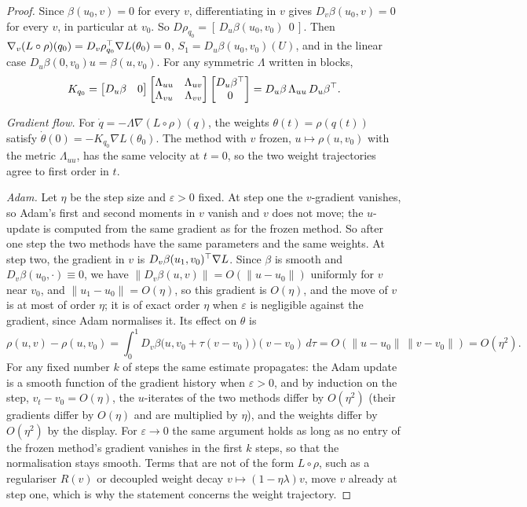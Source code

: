 \begin{proof}
Since $\beta(u_0,v)=0$ for every $v$, differentiating in $v$ gives $D_v\beta(u_0,v)=0$ for every $v$, in particular at
$v_0$. So $D\rho_{q_0}=[\,D_u\beta(u_0,v_0)\ \ 0\,]$. Then $\nabla_v(L\circ\rho)(q_0)=D_v\rho_{q_0}^{\top}\nabla L(\theta_0)=0$,
$S_1=D_u\beta(u_0,v_0)(U)$, and in the linear case $D_u\beta(0,v_0)u=\beta(u,v_0)$. For any symmetric $\Lambda$ written in
blocks,
\begin{equation*}
  K_{q_0}=\begin{bmatrix}D_u\beta&0\end{bmatrix}\begin{bmatrix}\Lambda_{uu}&\Lambda_{uv}\\ \Lambda_{vu}&\Lambda_{vv}
  \end{bmatrix}\begin{bmatrix}D_u\beta^{\top}\\ 0\end{bmatrix}=D_u\beta\,\Lambda_{uu}\,D_u\beta^{\top} .
\end{equation*}

\emph{Gradient flow.} For $\dot q=-\Lambda\nabla(L\circ\rho)(q)$, the weights $\theta(t)=\rho(q(t))$ satisfy
$\dot\theta(0)=-K_{q_0}\nabla L(\theta_0)$. The method with $v$ frozen, $u\mapsto\rho(u,v_0)$ with the metric
$\Lambda_{uu}$, has the same velocity at $t=0$, so the two weight trajectories agree to first order in $t$.

\emph{Adam.} Let $\eta$ be the step size and $\varepsilon>0$ fixed. At step one the $v$-gradient vanishes, so Adam's
first and second moments in $v$ vanish and $v$ does not move; the $u$-update is computed from the same gradient as for the
frozen method. So after one step the two methods have the same parameters and the same weights. At step two, the gradient
in $v$ is $D_v\beta(u_1,v_0)^{\top}\nabla L$. Since $\beta$ is smooth and $D_v\beta(u_0,\cdot)\equiv0$, we have
$\|D_v\beta(u,v)\|=O(\|u-u_0\|)$ uniformly for $v$ near $v_0$, and $\|u_1-u_0\|=O(\eta)$, so this gradient is $O(\eta)$,
and the move of $v$ is at most of order $\eta$; it is of exact order $\eta$ when $\varepsilon$ is negligible against the
gradient, since Adam normalises it. Its effect on $\theta$ is
\begin{equation*}
  \rho(u,v)-\rho(u,v_0)=\int_0^1D_v\beta\big(u,v_0+\tau(v-v_0)\big)(v-v_0)\,d\tau=O(\|u-u_0\|\,\|v-v_0\|)=O(\eta^2).
\end{equation*}
For any fixed number $k$ of steps the same estimate propagates: the Adam update is a smooth function of the gradient
history when $\varepsilon>0$, and by induction on the step, $v_t-v_0=O(\eta)$, the $u$-iterates of the two methods
differ by $O(\eta^2)$ (their gradients differ by $O(\eta)$ and are multiplied by $\eta$), and the weights differ by
$O(\eta^2)$ by the display. For $\varepsilon\to0$ the same argument holds as long as no entry of the frozen method's
gradient vanishes in the first $k$ steps, so that the normalisation stays smooth. Terms that are not of the form
$L\circ\rho$, such as a regulariser $R(v)$ or decoupled weight decay $v\mapsto(1-\eta\lambda)v$, move $v$ already at step
one, which is why the statement concerns the weight trajectory.


\end{proof}
